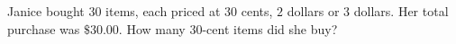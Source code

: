 Janice bought $30$ items, each priced at $30$ cents, $2$ dollars or $3$ dollars. Her total purchase was $\$30.00$. How many $30$-cent items did she buy?
